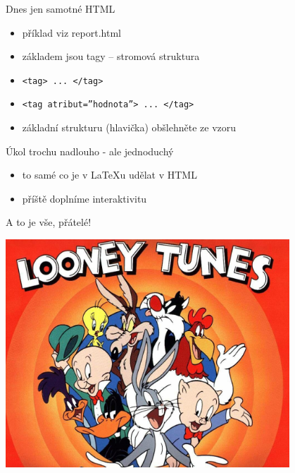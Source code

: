 \documentclass{beamer}
\begin{document}
\begin{frame}{Dnes jen samotné HTML}
  \begin{itemize}
    \item příklad viz report.html
    \item základem jsou tagy -- stromová struktura
    \item \texttt{<tag> ... </tag>}
    \item \texttt{<tag atribut=''hodnota''> ... </tag>}
    \item základní strukturu (hlavička) obšlehněte ze vzoru
  \end{itemize}
\end{frame}

\begin{frame}{Úkol trochu nadlouho - ale jednoduchý}
  \begin{itemize}
    \item to samé co je v LaTeXu udělat v HTML
    \item příště doplníme interaktivitu
  \end{itemize}
\end{frame}

\begin{frame}{A to je vše, přátelé!}
  \begin{center}
    \includegraphics[width=0.8\textwidth]{looney_tunes}
  \end{center}
\end{frame}
\end{document}
